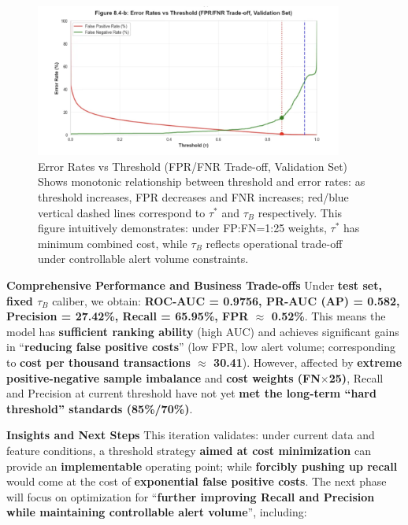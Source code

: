 \documentclass[sigplan,screen]{acmart}
\begin{document}
\begin{figure}[h!]
    \centering
    \includegraphics[width=0.9\textwidth]{8.4b.jpg}
    \caption{Error Rates vs Threshold (FPR/FNR Trade-off, Validation Set) Shows monotonic relationship between threshold and error rates: as threshold increases, FPR decreases and FNR increases; red/blue vertical dashed lines correspond to $\tau^*$ and $\tau_B$ respectively. This figure intuitively demonstrates: under FP:FN=1:25 weights, $\tau^*$ has minimum combined cost, while $\tau_B$ reflects operational trade-off under controllable alert volume constraints.}
    \label{fig:8.4b}
\end{figure}

\textbf{Comprehensive Performance and Business Trade-offs} Under \textbf{test set, fixed $\tau_B$} caliber, we obtain: \textbf{ROC-AUC = 0.9756, PR-AUC (AP) = 0.582, Precision = 27.42\%, Recall = 65.95\%, FPR $\approx$ 0.52\%}. This means the model has \textbf{sufficient ranking ability} (high AUC) and achieves significant gains in ``\textbf{reducing false positive costs}'' (low FPR, low alert volume; corresponding to \textbf{cost per thousand transactions $\approx$ 30.41}). However, affected by \textbf{extreme positive-negative sample imbalance} and \textbf{cost weights (FN$\times$25)}, Recall and Precision at current threshold have not yet \textbf{met the long-term ``hard threshold'' standards (85\%/70\%)}.

\textbf{Insights and Next Steps} This iteration validates: under current data and feature conditions, a threshold strategy \textbf{aimed at cost minimization} can provide an \textbf{implementable} operating point; while \textbf{forcibly pushing up recall} would come at the cost of \textbf{exponential false positive costs}. The next phase will focus on optimization for ``\textbf{further improving Recall and Precision while maintaining controllable alert volume}'', including:
\end{document}
